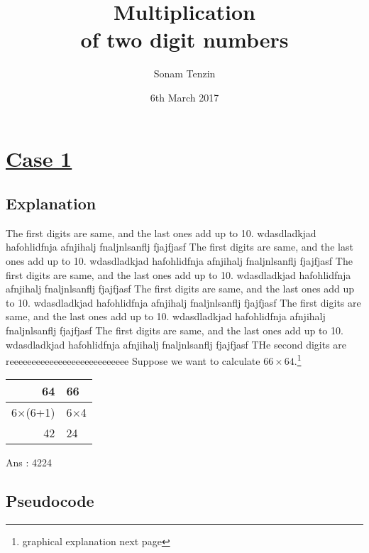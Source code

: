\documentclass[11pt, a4paper]{article}
\title{Multiplication \\of two digit numbers}
\author{Sonam Tenzin}
\date{6th March 2017}
\begin{document}
	\maketitle
	\newpage
	\section{\underline{Case 1}}
	\subsection{Explanation}
	The first digits are same, and the last ones add up to 10. wdasdladkjad hafohlidfnja afnjihalj fnaljnlsanflj  fjajfjasf The first digits are same, and the last ones add up to 10. wdasdladkjad hafohlidfnja afnjihalj fnaljnlsanflj  fjajfjasf The first digits are same, and the last ones add up to 10. wdasdladkjad hafohlidfnja afnjihalj fnaljnlsanflj  fjajfjasf The first digits are same, and the last ones add up to 10. wdasdladkjad hafohlidfnja afnjihalj fnaljnlsanflj  fjajfjasf
	The first digits are same, and the last ones add up to 10. wdasdladkjad hafohlidfnja afnjihalj fnaljnlsanflj  fjajfjasf
	The first digits are same, and the last ones add up to 10. wdasdladkjad hafohlidfnja afnjihalj fnaljnlsanflj  fjajfjasf
	THe second digits are reeeeeeeeeeeeeeeeeeeeeeeeeee
	Suppose we want to calculate $66 \times 64$.\footnote{graphical explanation next page}\\
	

	{\begin{center}
	\begin{tabular}{rl}
		64 & 66\\
		\hline
		 6$\times$(6+1) & 6$\times$4\\
		 42 & 24\\
		 
	\end{tabular}
	\end{center}}
	Ans : 4224
		
	\subsection{Pseudocode}\label{B1}
	\begin{algorithm}
		{}
	\end{algorithm}
		
\end{document}
